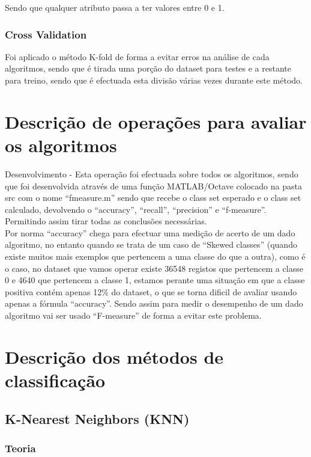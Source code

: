 \documentclass[portugues,final]{revdetua}
\begin{document}
Sendo que qualquer atributo passa a ter valores entre 0 e 1.

\subsubsection{Cross Validation}

Foi aplicado o método K-fold de forma a evitar erros na análise de cada algoritmos, sendo que é tirada uma porção do dataset para testes e a restante para treino, sendo que é efectuada esta divisão várias vezes durante este método.

\section{Descrição de operações para avaliar os algoritmos}

Desenvolvimento - Esta operação foi efectuada sobre todos os algoritmos, sendo que foi desenvolvida através de uma função MATLAB/Octave colocado na pasta src com o nome “fmeasure.m” sendo que recebe o class set esperado e o class set calculado, devolvendo o “accuracy”, “recall”, “precision” e “f-measure”. Permitindo assim tirar todas as conclusões necessárias.\\

Por norma “accuracy” chega para efectuar uma medição de acerto de um dado algoritmo, no entanto quando se trata de um caso de “Skewed classes” (quando existe muitos mais exemplos que pertencem a uma classe do que a outra), como é o caso, no dataset que vamos operar existe 36548 registos que pertencem a classe 0 e 4640 que pertencem a classe 1, estamos perante uma situação em que a classe positiva contém apenas 12\% do dataset, o que se torna dificil de avaliar usando apenas a fórmula “accuracy”.
Sendo assim para medir o desempenho de um dado algoritmo vai ser usado “F-measure” de forma a evitar este problema.

\section{Descrição dos métodos de classificação}

\subsection{K-Nearest Neighbors (KNN)}

\subsubsection{Teoria}
\end{document}
